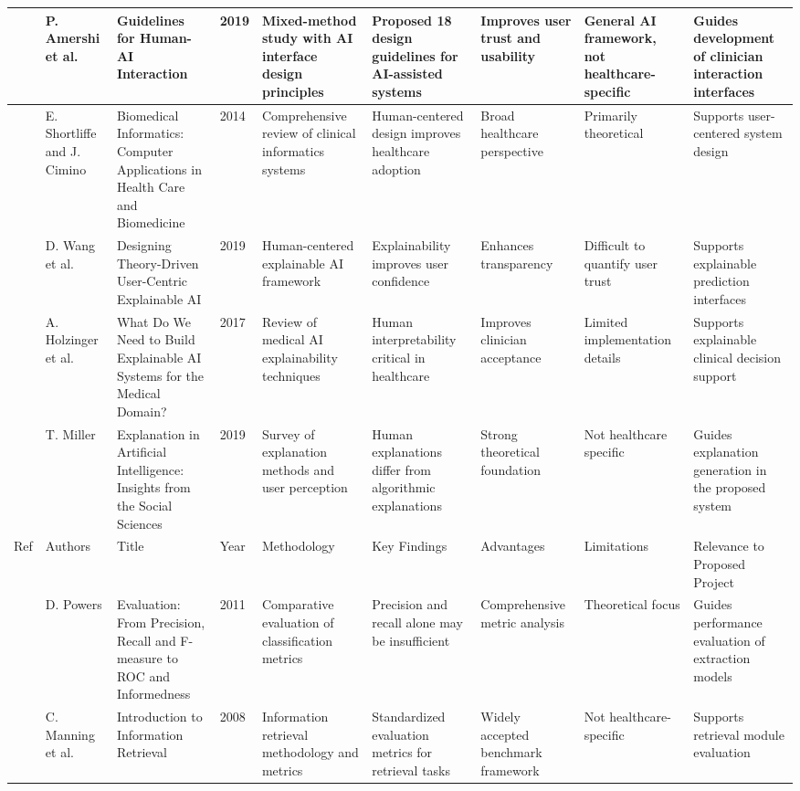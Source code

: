 \begin{landscape}
\begin{singlespace}
\begin{longtable}{|p{0.8cm}|p{1.8cm}|p{3.2cm}|p{0.8cm}|p{3.6cm}|p{3.6cm}|p{2.5cm}|p{2.5cm}|p{3.2cm}|}
\hline
\cite{ref63} & P. Amershi et al. & Guidelines for Human-AI Interaction & 2019 & Mixed-method study with AI interface design principles & Proposed 18 design guidelines for AI-assisted systems & Improves user trust and usability & General AI framework, not healthcare-specific & Guides development of clinician interaction interfaces \\
\hline
\cite{ref64} & E. Shortliffe and J. Cimino & Biomedical Informatics: Computer Applications in Health Care and Biomedicine & 2014 & Comprehensive review of clinical informatics systems & Human-centered design improves healthcare adoption & Broad healthcare perspective & Primarily theoretical & Supports user-centered system design \\
\hline
\cite{ref65} & D. Wang et al. & Designing Theory-Driven User-Centric Explainable AI & 2019 & Human-centered explainable AI framework & Explainability improves user confidence & Enhances transparency & Difficult to quantify user trust & Supports explainable prediction interfaces \\
\hline
\cite{ref66} & A. Holzinger et al. & What Do We Need to Build Explainable AI Systems for the Medical Domain? & 2017 & Review of medical AI explainability techniques & Human interpretability critical in healthcare & Improves clinician acceptance & Limited implementation details & Supports explainable clinical decision support \\
\hline
\cite{ref67} & T. Miller & Explanation in Artificial Intelligence: Insights from the Social Sciences & 2019 & Survey of explanation methods and user perception & Human explanations differ from algorithmic explanations & Strong theoretical foundation & Not healthcare specific & Guides explanation generation in the proposed system \\
\hline
Ref & Authors & Title & Year & Methodology & Key Findings & Advantages & Limitations & Relevance to Proposed Project \\
\hline
\cite{ref68} & D. Powers & Evaluation: From Precision, Recall and F-measure to ROC and Informedness & 2011 & Comparative evaluation of classification metrics & Precision and recall alone may be insufficient & Comprehensive metric analysis & Theoretical focus & Guides performance evaluation of extraction models \\
\hline
\cite{ref69} & C. Manning et al. & Introduction to Information Retrieval & 2008 & Information retrieval methodology and metrics & Standardized evaluation metrics for retrieval tasks & Widely accepted benchmark framework & Not healthcare-specific & Supports retrieval module evaluation \\

\end{longtable}
\end{singlespace}
\end{landscape}
